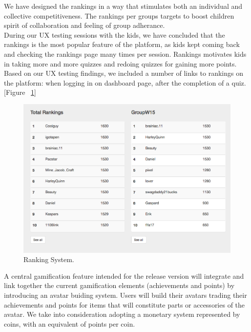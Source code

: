 We have designed the rankings in a way that stimulates both an individual and collective competitiveness. The rankings per groups targets to boost children spirit of collaboration and feeling of group adherance. \\

During our UX testing sessions with the kids, we have concluded that the rankings is the most popular feature of the platform, as kids kept coming back and checking the rankings page many times per session. Rankings motivates kids in taking more and more quizzes and redoing quizzes for gaining more points.
Based on our UX testing findings, we included a number of links to rankings on the platform: when logging in on dashboard page, after the completion of a quiz. [Figure ~\ref{fig:Rankings}] 
\\

\begin{figure}
\includegraphics[width=1\linewidth]{images/ui/Rankings.png}
\caption{Ranking System.}
\label{fig:Rankings}
\end{figure}

A central gamification feature intended for the release version will integrate and link together the current gamification elements (achievements and points) by introducing an avatar buiding system. Users will build their avatars trading their achievements and points for items that will constitute parts or accessories of the avatar. We take into consideration adopting a monetary system represented by coins, with an equivalent of points per coin.



